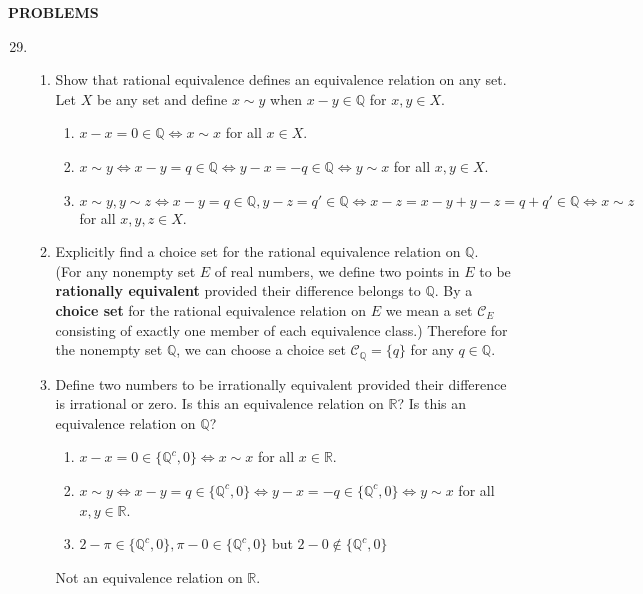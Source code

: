 \begin{center}
	\textbf{PROBLEMS}
\end{center}
\begin{enumerate}
	\setcounter{enumi}{28}
	\item 
	\begin{enumerate}[label=(\roman*),align=left]
		\item Show that rational equivalence defines an equivalence relation on any set.\\
		Let $X$ be any set and define $x\sim y$ when $x-y\in\mathbb{Q}$ for $x,y\in X$.
		\begin{enumerate}
			\item $x-x=0\in\mathbb{Q}\iff x\sim x$ for all $x\in X$.
			\item $x\sim y \iff x-y=q \in\mathbb{Q}\iff y-x=-q\in\mathbb{Q}\iff y\sim x$ for all $x,y\in X$.
			\item $x\sim y,y\sim z \iff x-y=q\in\mathbb{Q},y-z=q'\in\mathbb{Q}\iff x-z=x-y+y-z=q+q'\in\mathbb{Q}\iff x\sim z$ for all $x,y,z\in X$.
		\end{enumerate}
		\item Explicitly find a choice set for the rational equivalence relation on $\mathbb{Q}$.\\
		(For any nonempty set $E$ of real numbers, we define two points in $E$ to be \textbf{rationally equivalent} provided their difference belongs to $\mathbb{Q}$. By a \textbf{choice set} for the rational equivalence relation on $E$ we mean a set $\mathcal{C}_E$ consisting of exactly one member of each equivalence class.)
		Therefore for the nonempty set $\mathbb{Q}$, we can choose a choice set $\mathcal{C}_{\mathbb{Q}}=\{q\}$ for any $q\in\mathbb{Q}$.
		\item Define two numbers to be irrationally equivalent provided their difference is irrational or zero. Is this an equivalence relation on $\mathbb{R}$? Is this an equivalence relation on $\mathbb{Q}$?\\
		\begin{enumerate}
			\item $x-x=0\in\{\mathbb{Q}^c,0\}\iff x\sim x$ for all $x\in \mathbb{R}$.
			\item $x\sim y \iff x-y=q \in\{\mathbb{Q}^c,0\}\iff y-x=-q\in\{\mathbb{Q}^c,0\}\iff y\sim x$ for all $x,y\in \mathbb{R}$.
			\item $2-\pi\in\{\mathbb{Q}^c,0\},\pi-0\in\{\mathbb{Q}^c,0\}$ but $2-0\notin\{\mathbb{Q}^c,0\}$
		\end{enumerate}
		Not an equivalence relation on $\mathbb{R}$.\\

\end{enumerate}
\end{enumerate}
